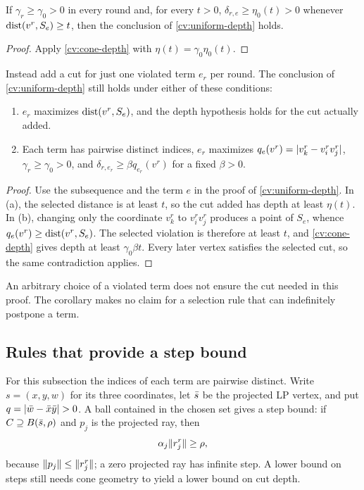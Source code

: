 \begin{corollary}\label{cv:pointed-convergence}
If $\gamma_r\ge\gamma_0>0$ in every round and, for every $t>0$,
$\delta_{r,e}\ge\eta_0(t)>0$ whenever $\operatorname{dist}(v^r,S_e)\ge t$, then the
conclusion of \cref{cv:uniform-depth} holds.
\end{corollary}

\begin{proof}
Apply \cref{cv:cone-depth} with $\eta(t)=\gamma_0\eta_0(t)$.
\end{proof}

\begin{corollary}\label{cv:one-term}
Instead add a cut for just one violated term $e_r$ per round. The conclusion
of \cref{cv:uniform-depth} still holds under either of these conditions:
\begin{enumerate}[label=(\alph*)]
\item $e_r$ maximizes $\operatorname{dist}(v^r,S_e)$, and the depth hypothesis holds for
      the cut actually added.
\item Each term has pairwise distinct indices, $e_r$ maximizes
      $q_e(v^r)=\lvert v_k^r-v_i^rv_j^r\rvert$, $\gamma_r\ge\gamma_0>0$, and
      $\delta_{r,e_r}\ge\beta q_{e_r}(v^r)$ for a fixed $\beta>0$.
\end{enumerate}
\end{corollary}

\begin{proof}
Use the subsequence and the term $e$ in the proof of
\cref{cv:uniform-depth}. In (a), the selected distance is at least $t$,
so the cut added has depth at least $\eta(t)$. In (b), changing only the
coordinate $v_k^r$ to $v_i^rv_j^r$ produces a point of $S_e$, whence
$q_e(v^r)\ge\operatorname{dist}(v^r,S_e)$. The selected violation is therefore at least
$t$, and \cref{cv:cone-depth} gives depth at least $\gamma_0\beta t$.
Every later vertex satisfies the selected cut, so the same contradiction
applies.
\end{proof}

An arbitrary choice of a violated term does not ensure the cut needed in
this proof. The corollary makes no claim for a selection rule that can
indefinitely postpone a term.

\subsection{Rules that provide a step bound}

For this subsection the indices of each term are pairwise distinct. Write
$s=(x,y,w)$ for its three coordinates, let $\bar s$ be the projected LP
vertex, and put $q=\lvert\bar w-\bar x\bar y\rvert>0$. A ball contained in the
chosen set gives a step bound: if $C\supseteq B(\bar s,\rho)$ and $p_j$ is
the projected ray, then
\[
 \alpha_j\lVert r_j^r\rVert\ge\rho,
\]
because $\lVert p_j\rVert\le\lVert r_j^r\rVert$; a zero projected ray has infinite
step. A lower bound on steps still needs cone geometry to yield a lower
bound on cut depth.

